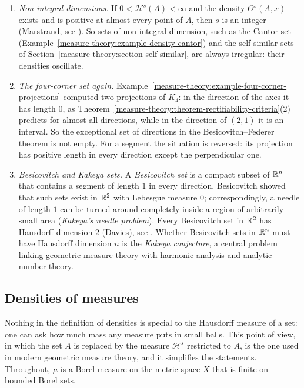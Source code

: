 \begin{remark}\label{measure-theory:remark-densities}
\begin{enumerate}
\item \emph{Non-integral dimensions.} If $0 < \mathcal{H}^s(A) < \infty$ and the density $\Theta^s(A, x)$ exists and is positive at almost every point of $A$, then $s$ is an integer (Marstrand, see
\cite{mattila-1995}). So sets of non-integral dimension, such as the Cantor set (Example~\ref{measure-theory:example-density-cantor}) and the self-similar sets of
Section~\ref{measure-theory:section-self-similar}, are always irregular: their densities oscillate.
\item \emph{The four-corner set again.} Example~\ref{measure-theory:example-four-corner-projections} computed two projections of $K_4$: in the direction of the axes it has length $0$, as
Theorem~\ref{measure-theory:theorem-rectifiability-criteria}(2) predicts for almost all directions, while in the direction of $(2, 1)$ it is an interval. So the exceptional set of directions in the
Besicovitch--Federer theorem is not empty. For a segment the situation is reversed: its projection has positive length in every direction except the perpendicular one.
\item \emph{Besicovitch and Kakeya sets.} A \emph{Besicovitch set} is a compact subset of $\mathbb{R}^n$ that contains a segment of length $1$ in every direction. Besicovitch showed that such sets exist in
$\mathbb{R}^2$ with Lebesgue measure $0$; correspondingly, a needle of length $1$ can be turned around completely inside a region of arbitrarily small area (\emph{Kakeya's needle problem}). Every Besicovitch
set in $\mathbb{R}^2$ has Hausdorff dimension $2$ (Davies), see \cite{falconer-gofs}. Whether Besicovitch sets in $\mathbb{R}^n$ must have Hausdorff dimension $n$ is the \emph{Kakeya conjecture}, a central problem
linking geometric measure theory with harmonic analysis and analytic number theory.
\end{enumerate}
\end{remark}

\subsection{Densities of measures}\label{measure-theory:subsection-measure-densities}

Nothing in the definition of densities is special to the Hausdorff measure of a set: one can ask how much mass any measure puts in small balls. This point of view, in which the set $A$ is replaced
by the measure $\mathcal{H}^s$ restricted to $A$, is the one used in modern geometric measure theory, and it simplifies the statements. Throughout, $\mu$ is a Borel measure on the metric space $X$ that is
finite on bounded Borel sets.

